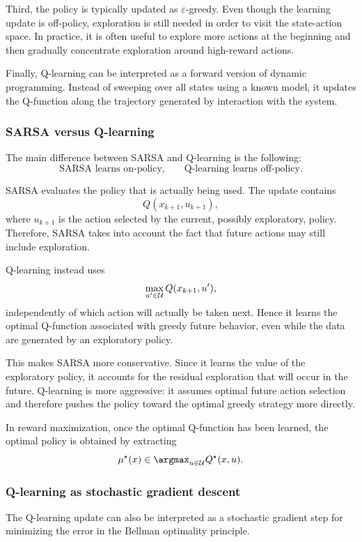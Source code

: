 Third, the policy is typically updated as \(\varepsilon\)-greedy. Even though the learning update
is off-policy, exploration is still needed in order to visit the state-action space. In practice, it is
often useful to explore more actions at the beginning and then gradually concentrate exploration
around high-reward actions.

Finally, Q-learning can be interpreted as a forward version of dynamic programming. Instead
of sweeping over all states using a known model, it updates the Q-function along the trajectory
generated by interaction with the system.

\subsubsection{SARSA versus Q-learning}

The main difference between SARSA and Q-learning is the following:
\[
\text{SARSA learns on-policy,}
\qquad
\text{Q-learning learns off-policy.}
\]

SARSA evaluates the policy that is actually being used. The update contains
\[
Q(x_{k+1},u_{k+1}),
\]
where \(u_{k+1}\) is the action selected by the current, possibly exploratory, policy. Therefore,
SARSA takes into account the fact that future actions may still include exploration.

Q-learning instead uses
\[
\max_{u'\in\mathcal{U}}Q(x_{k+1},u'),
\]
independently of which action will actually be taken next. Hence it learns the optimal Q-function
associated with greedy future behavior, even while the data are generated by an exploratory
policy.

This makes SARSA more conservative. Since it learns the value of the exploratory policy, it
accounts for the residual exploration that will occur in the future. Q-learning is more aggressive:
it assumes optimal future action selection and therefore pushes the policy toward the optimal
greedy strategy more directly.

In reward maximization, once the optimal Q-function has been learned, the optimal policy is
obtained by extracting
\[
\mu^\star(x)
\in
\argmax_{u\in\cU}Q^\star(x,u).
\]

\subsubsection{Q-learning as stochastic gradient descent}

The Q-learning update can also be interpreted as a stochastic gradient step for minimizing the
error in the Bellman optimality principle.


